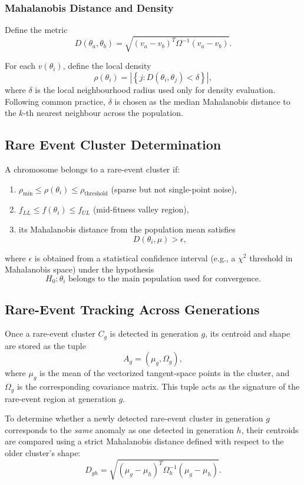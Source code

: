 \documentclass{article}
\begin{document}
\subsubsection*{Mahalanobis Distance and Density}
Define the metric
\[
D(\theta_a,\theta_b)=\sqrt{(v_a-v_b)^T \Omega^{-1}(v_a-v_b)}.
\]

For each $v(\theta_i)$, define the local density
\[
\rho(\theta_i)
=\left|\left\{ j : D(\theta_i,\theta_j) < \delta \right\}\right|,
\]
where $\delta$ is the local neighbourhood radius used only for density evaluation. Following common practice, $\delta$ is chosen as the median Mahalanobis distance to the $k$-th nearest neighbour across the population.

\subsection*{Rare Event Cluster Determination}

A chromosome belongs to a rare-event cluster if:

\begin{enumerate}
    \item $\rho_{\min} \le \rho(\theta_i) \le \rho_{\text{threshold}}$
    \quad (sparse but not single-point noise),
    \item $f_{LL} \le f(\theta_i) \le f_{UL}$
    \quad (mid-fitness valley region),
    \item its Mahalanobis distance from the population mean satisfies
    \[
    D(\theta_i,\mu) > \epsilon,
    \]
\end{enumerate}

where $\epsilon$ is obtained from a statistical confidence interval (e.g., a $\chi^2$ threshold in Mahalanobis space) under the hypothesis
\[
H_0 : \theta_i \text{ belongs to the main population used for convergence}.
\]

\subsection*{Rare-Event Tracking Across Generations}

Once a rare-event cluster $C_g$ is detected in generation $g$, its centroid and shape are stored as the tuple
\[
A_g = (\mu_g, \Omega_g),
\]
where $\mu_g$ is the mean of the vectorized tangent-space points in the cluster, and $\Omega_g$ is the corresponding covariance matrix. This tuple acts as the signature of the rare-event region at generation $g$.

To determine whether a newly detected rare-event cluster in generation $g$ corresponds to the \emph{same} anomaly as one detected in generation $h$, their centroids are compared using a strict Mahalanobis distance defined with respect to the older cluster's shape:
\[
D_{gh} = \sqrt{(\mu_g - \mu_h)^T \Omega_h^{-1} (\mu_g - \mu_h)}.
\]
\end{document}
